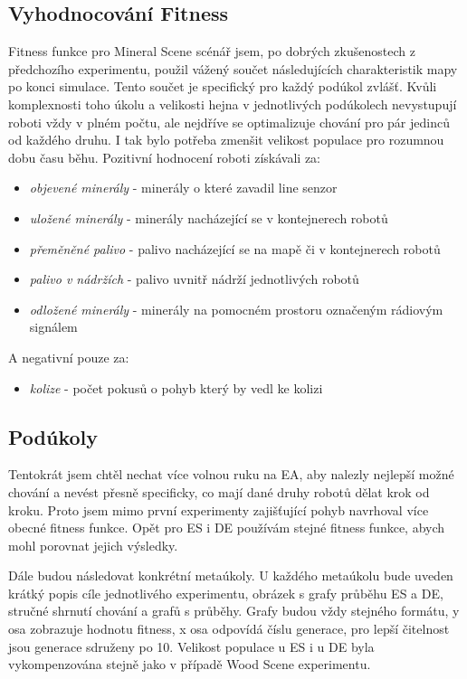 \subsection{Vyhodnocování Fitness}
Fitness funkce pro Mineral Scene scénář jsem, po dobrých zkušenostech z předchozího experimentu, použil vážený součet následujících charakteristik mapy po konci simulace. Tento součet je specifický pro každý podúkol zvlášť. Kvůli komplexnosti toho úkolu a velikosti hejna v jednotlivých podúkolech nevystupují roboti vždy v plném počtu, ale nejdříve se optimalizuje chování pro pár jedinců od každého druhu. I tak bylo potřeba zmenšit velikost populace pro rozumnou dobu času běhu. Pozitivní hodnocení roboti získávali za: 
\begin{itemize}
	\item \textit{objevené minerály} - minerály o které zavadil line senzor
	\item \textit{uložené minerály} - minerály nacházející se v kontejnerech robotů 
	\item \textit{přeměněné palivo} - palivo nacházející se na mapě či v kontejnerech robotů
	\item \textit{palivo v nádržích} - palivo uvnitř nádrží jednotlivých robotů
	\item \textit{odložené minerály} - minerály na pomocném prostoru označeným rádiovým signálem
\end{itemize}
A negativní pouze za: 
\begin{itemize}
	\item \textit{kolize} - počet pokusů o pohyb který by vedl ke kolizi
\end{itemize}
\subsection{Podúkoly}
Tentokrát jsem chtěl nechat více volnou ruku na EA, aby nalezly nejlepší možné chování a nevést přesně specificky, co mají dané druhy robotů dělat krok od kroku. Proto jsem mimo první experimenty zajišťující pohyb navrhoval více obecné fitness funkce. Opět pro ES i DE používám stejné fitness funkce, abych mohl porovnat jejich výsledky. 

Dále budou následovat konkrétní metaúkoly. U každého metaúkolu bude uveden krátký popis cíle jednotlivého experimentu, obrázek s grafy průběhu ES a DE, stručné shrnutí chování a grafů s průběhy. Grafy budou vždy stejného formátu,  y osa zobrazuje hodnotu fitness, x osa odpovídá číslu generace, pro lepší čitelnost jsou generace sdruženy po 10. Velikost populace u ES i u DE byla vykompenzována stejně jako v případě Wood Scene experimentu. 
\clearpage


